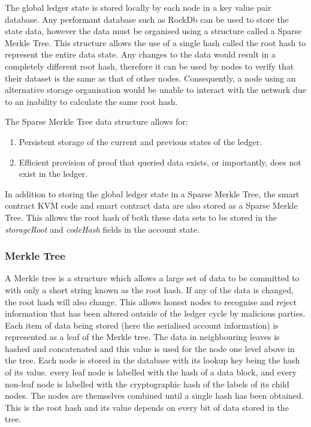 
The global ledger state is stored locally by each node in a key value pair database. Any performant database such as RockDb can be used to store the state data, however the data must be organised using a structure called a Sparse Merkle Tree. This structure allows the use of a single hash called the root hash to represent the entire data state. Any changes to the data would result in a completely different root hash, therefore it can be used by nodes to verify that their dataset is the same as that of other nodes. Consequently, a node using an alternative storage organisation would be unable to interact with the network due to an inability to calculate the same root hash.

The Sparse Merkle Tree data structure allows for:

\begin{enumerate}
\item Persistent storage of the current and previous states of the ledger.
\item Efficient provision of proof that queried data exists, or importantly, does not exist in the ledger.\end{enumerate}

In addition to storing the global ledger state in a Sparse Merkle Tree, the smart contract KVM code and smart contract data are also stored as a Sparse Merkle Tree. This allows the root hash of both these data sets to be stored in the \emph{storageRoot} and \emph{codeHash} fields in the account state.

\subsubsection{Merkle Tree}

A Merkle tree is a structure which allows a large set of data to be committed to with only a short string known as the root hash. If any of the data is changed, the root hash will also change. This allows honest nodes to recognise and reject information that has been altered outside of the ledger cycle by malicious parties. \\

Each item of data being stored (here the serialised account information) is represented as a leaf of the Merkle tree. The data in neighbouring leaves is hashed and concatenated and this value is used for the node one level above in the tree. Each node is stored in the database with its lookup key being the hash of its value. every leaf node is labelled with the hash of a data block, and every non-leaf node is labelled with the cryptographic hash of the labels of its child nodes. The nodes are themselves combined until a single hash has been obtained. This is the root hash and its value depends on every bit of data stored in the tree.\\

